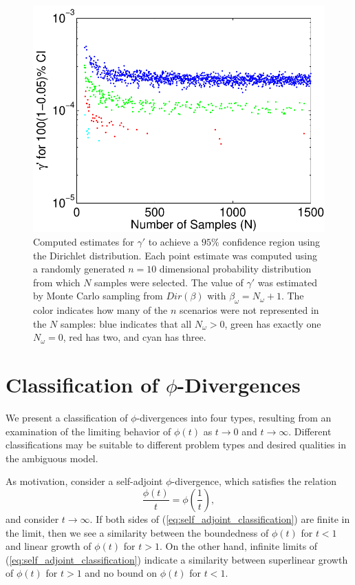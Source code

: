 \documentclass[11pt]{article}
\begin{document}
\begin{figure}
	\centering
	\includegraphics[width=.6\textwidth]{images/gammaprime_diff_samples_dim_10}
	\caption{
		Computed estimates for $\gamma'$ to achieve a $95\%$ confidence region using the Dirichlet distribution.
		Each point estimate was computed using a randomly generated $n=10$ dimensional probability distribution from which $N$ samples were selected.
		The value of $\gamma'$ was estimated by Monte Carlo sampling from $Dir(\beta)$ with $\beta_\omega = N_\omega + 1$.
		The color indicates how many of the $n$ scenarios were not represented in the $N$ samples: blue indicates that all $N_\omega > 0$, green has exactly one $N_\omega = 0$, red has two, and cyan has three.
	}
	\label{fig:gammaprime_by_sample}
\end{figure}

\section{Classification of $\phi$-Divergences}

We present a classification of $\phi$-divergences into four types, resulting from an examination of the limiting behavior of $\phi(t)$ as $t \rightarrow 0$ and $t \rightarrow \infty$.
Different classifications may be suitable to different problem types and desired qualities in the ambiguous model.

As motivation, consider a self-adjoint $\phi$-divergence, which satisfies the relation
\begin{equation} \label{eq:self_adjoint_classification}
	\frac{\phi(t)}{t} = \phi\left(\frac{1}{t}\right),
\end{equation}
and consider $t \rightarrow \infty$.
If both sides of (\ref{eq:self_adjoint_classification}) are finite in the limit, then we see a similarity between the boundedness of $\phi(t)$ for $t < 1$ and linear growth of $\phi(t)$ for $t > 1$.
On the other hand, infinite limits of (\ref{eq:self_adjoint_classification}) indicate a similarity between superlinear growth of $\phi(t)$ for $t > 1$ and no bound on $\phi(t)$ for $t < 1$.
\end{document}
